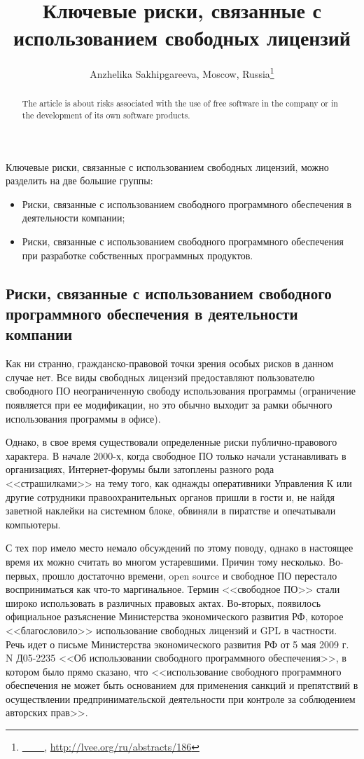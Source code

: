 \documentclass[10pt, a5paper]{article}
\begin{document}
\title{Ключевые риски, связанные с использованием свободных лицензий}
\author{Anzhelika Sakhipgareeva, Moscow, Russia\footnote{\url{___}, \url{http://lvee.org/ru/abstracts/186}}}
\maketitle
\begin{abstract}
The article is about risks associated with the use of free software in the company or in the development of its own software products.
\end{abstract}

Ключевые риски, связанные с использованием свободных лицензий, можно разделить на две большие группы:

\begin{itemize}
  \item Риски, связанные с использованием свободного программного обеспечения в деятельности компании;
  \item Риски, связанные с использованием свободного программного обеспечения при разработке собственных программных продуктов.
\end{itemize}

\subsection*{Риски, связанные с использованием свободного программного обеспечения в деятельности компании}

Как ни странно, гражданско-правовой точки зрения особых рисков в данном случае нет. Все виды свободных лицензий предоставляют пользователю свободного ПО неограниченную свободу использования программы (ограничение появляется при ее модификации, но это обычно выходит за рамки обычного использования программы в офисе).

Однако, в свое время существовали определенные риски \linebreak публично-правового характера. В начале 2000-х, когда свободное ПО только начали устанавливать в организациях, Интернет-форумы были затоплены разного рода <<страшилками>> на тему того, как однажды оперативники Управления К или другие сотрудники правоохранительных органов пришли в гости и, не найдя заветной наклейки на системном блоке, обвиняли в пиратстве и опечатывали компьютеры.

С тех пор имело место немало обсуждений по этому поводу, однако в настоящее время их можно считать во многом устаревшими. Причин тому несколько. Во-первых, прошло достаточно времени, open source и свободное ПО перестало восприниматься как что-то маргинальное. Термин <<свободное ПО>> стали широко использовать в различных правовых актах. Во-вторых, появилось официальное разъяснение Министерства экономического развития РФ, которое <<благословило>> использование свободных лицензий и GPL в частности. Речь идет о письме Министерства экономического развития РФ от 5 мая 2009 г. N Д05-2235 <<Об использовании свободного программного обеспечения>>, в котором было прямо сказано, что <<использование свободного программного обеспечения не может быть основанием для применения санкций и препятствий в осуществлении предпринимательской деятельности при контроле за соблюдением авторских прав>>.
\end{document}
